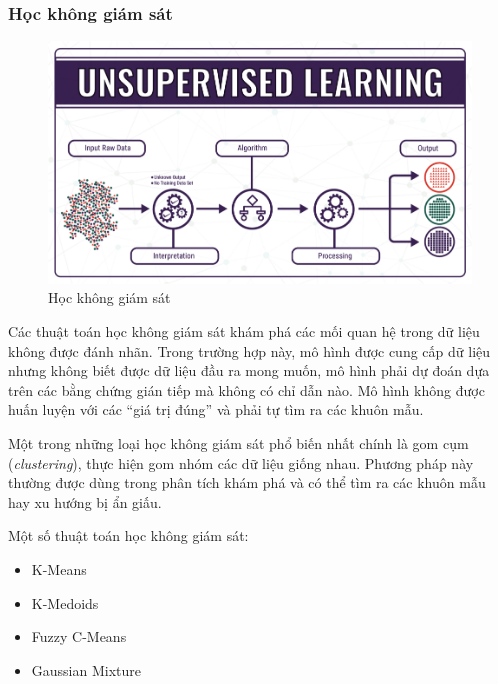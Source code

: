 \subsubsection{Học không giám sát}
\begin{figure}[htb]
    \centering
    \includegraphics[width=\textwidth]{image/unsupervised-learning.png}
    \caption[Học không giám sát]{Học không giám sát\footnotemark}
    \label{figure:unsupervised-learning}
\end{figure}

Các thuật toán học không giám sát khám phá các mối quan hệ trong dữ liệu không được đánh nhãn. Trong trường hợp này, mô hình được cung cấp dữ liệu nhưng không biết được dữ liệu đầu ra mong muốn, mô hình phải dự đoán dựa trên các bằng chứng gián tiếp mà không có chỉ dẫn nào. Mô hình không được huấn luyện với các ``giá trị đúng'' và phải tự tìm ra các khuôn mẫu.\cite{webpage}

Một trong những loại học không giám sát phổ biến nhất chính là gom cụm (\textit{clustering}), thực hiện gom nhóm các dữ liệu giống nhau. Phương pháp này thường được dùng trong phân tích khám phá và có thể tìm ra các khuôn mẫu hay xu hướng bị ẩn giấu.

Một số thuật toán học không giám sát:
\begin{itemize}
    \item K-Means
    \item K-Medoids
    \item Fuzzy C-Means
    \item Gaussian Mixture
\end{itemize}

